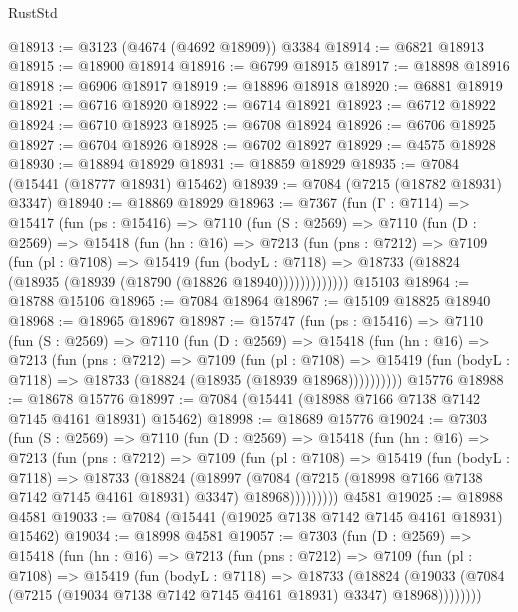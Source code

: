 \begin{lexlean}{RustStd}
\begin{coremodule}
@18913 := @3123 (@4674 (@4692 @18909)) @3384
@18914 := @6821 @18913
@18915 := @18900 @18914
@18916 := @6799 @18915
@18917 := @18898 @18916
@18918 := @6906 @18917
@18919 := @18896 @18918
@18920 := @6881 @18919
@18921 := @6716 @18920
@18922 := @6714 @18921
@18923 := @6712 @18922
@18924 := @6710 @18923
@18925 := @6708 @18924
@18926 := @6706 @18925
@18927 := @6704 @18926
@18928 := @6702 @18927
@18929 := @4575 @18928
@18930 := @18894 @18929
@18931 := @18859 @18929
@18935 := @7084 (@15441 (@18777 @18931) @15462)
@18939 := @7084 (@7215 (@18782 @18931) @3347)
@18940 := @18869 @18929
@18963 := @7367
    (fun (Γ : @7114) =>
    @15417
      (fun (ps : @15416) =>
      @7110
        (fun (S : @2569) =>
        @7110
          (fun (D : @2569) =>
          @15418
            (fun (hn : @16) =>
            @7213
              (fun (pns : @7212) =>
              @7109
                (fun (pl : @7108) =>
                @15419
                  (fun (bodyL : @7118) =>
                  @18733 (@18824 (@18935 (@18939 (@18790 (@18826 @18940)))))))))))))
    @15103
@18964 := @18788 @15106
@18965 := @7084 @18964
@18967 := @15109 @18825 @18940
@18968 := @18965 @18967
@18987 := @15747
    (fun (ps : @15416) =>
    @7110
      (fun (S : @2569) =>
      @7110
        (fun (D : @2569) =>
        @15418
          (fun (hn : @16) =>
          @7213
            (fun (pns : @7212) =>
            @7109
              (fun (pl : @7108) =>
              @15419 (fun (bodyL : @7118) => @18733 (@18824 (@18935 (@18939 @18968))))))))))
    @15776
@18988 := @18678 @15776
@18997 := @7084 (@15441 (@18988 @7166 @7138 @7142 @7145 @4161 @18931) @15462)
@18998 := @18689 @15776
@19024 := @7303
    (fun (S : @2569) =>
    @7110
      (fun (D : @2569) =>
      @15418
        (fun (hn : @16) =>
        @7213
          (fun (pns : @7212) =>
          @7109
            (fun (pl : @7108) =>
            @15419
              (fun (bodyL : @7118) =>
              @18733
                (@18824
                  (@18997
                    (@7084
                      (@7215 (@18998 @7166 @7138 @7142 @7145 @4161 @18931) @3347)
                      @18968)))))))))
    @4581
@19025 := @18988 @4581
@19033 := @7084 (@15441 (@19025 @7138 @7142 @7145 @4161 @18931) @15462)
@19034 := @18998 @4581
@19057 := @7303
    (fun (D : @2569) =>
    @15418
      (fun (hn : @16) =>
      @7213
        (fun (pns : @7212) =>
        @7109
          (fun (pl : @7108) =>
          @15419
            (fun (bodyL : @7118) =>
            @18733
              (@18824
                (@19033 (@7084 (@7215 (@19034 @7138 @7142 @7145 @4161 @18931) @3347) @18968))))))))

\end{coremodule}
\end{lexlean}
